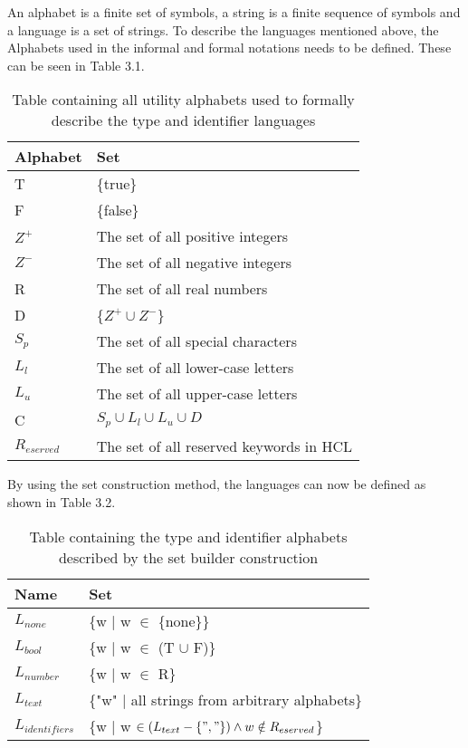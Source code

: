 An alphabet is a finite set of symbols, a string is a finite sequence of symbols and a language is a set of strings.
To describe the languages mentioned above, the Alphabets used in the informal and formal notations needs to be defined. 
These can be seen in Table 3.1.

\begin{table}[!htb]
	\centering
	\begin{tabular}{|l|l|}
		\hline
		\textbf{Alphabet} & \textbf{Set}                            \\ \hline
		T                 & \{true\}                                \\ \hline
		F                 & \{false\}                               \\ \hline
		$Z^+$             & The set of all positive integers        \\ \hline
		$Z^-$             & The set of all negative integers        \\ \hline
		R                 & The set of all real numbers             \\ \hline
		D                 & \{$Z^+ \cup Z^-$\}                      \\ \hline
		$S_p$             & The set of all special characters      \\ \hline
		$L_l$             & The set of all lower-case letters       \\ \hline
		$L_u$             & The set of all upper-case letters       \\ \hline
		C                 & $S_p \cup L_l \cup L_u \cup D$          \\ \hline
		$R_{eserved}$     & The set of all reserved keywords in HCL \\ \hline
	\end{tabular}
	\caption{Table containing all utility alphabets used to formally describe the type and identifier languages}
\end{table}

By using the set construction method, the languages can now be defined as shown in Table 3.2.

\begin{table}[!htb]
	\centering
	\label{my-label}
	\begin{tabular}{|l|l|}
		\hline
		\textbf{Name}     & \textbf{Set}                                    \\ \hline
		$L_{none}$        & \{w | w $\in$ \{none\}\}                        \\ \hline
		$L_{bool}$        & \{w | w $\in$ (T $\cup$ F)\}                    \\ \hline
		$L_{number}$      & \{w | w $\in$ R\}                               \\ \hline
		$L_{text}$        & \{"w" | all strings from arbitrary alphabets\}  \\ \hline
		$L_{identifiers}$ & \{w | w $\in (L_{text} - \{", "\}) \wedge w \notin R_{eserved}$\} \\ \hline
	\end{tabular}
	\caption{Table containing the type and identifier alphabets described by the set builder construction}
\end{table}


